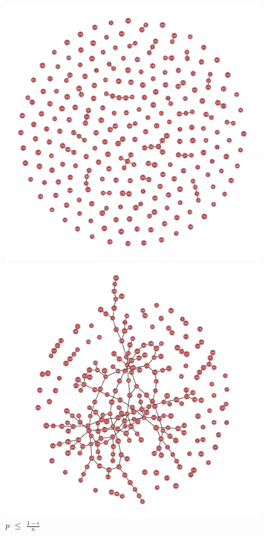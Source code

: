 \documentclass{article}
\begin{document}
\begin{figure}[!htb]
  \includegraphics[width=\linewidth]{ER_Examples/ER_SP.png}
  \caption*{$p$ $\leq$ $\frac{1-\epsilon}{n}$}
\endminipage\hfill
{}
  \includegraphics[width=\linewidth]{ER_Examples/ER_GC.png}

\end{figure}
\end{document}
